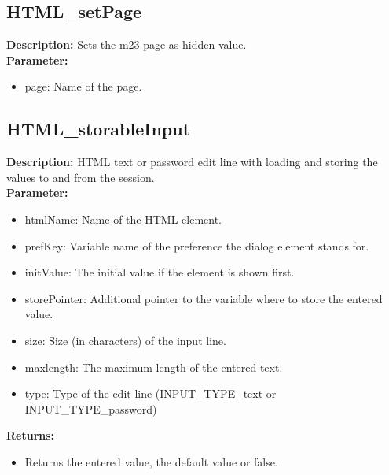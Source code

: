 \subsection{HTML\_setPage}
\textbf{Description:} Sets the m23 page as hidden value.\\
\textbf{Parameter:}
\begin{itemize}
\item page: Name of the page.
\end{itemize}

\subsection{HTML\_storableInput}
\textbf{Description:} HTML text or password edit line with loading and storing the values to and from the session.\\
\textbf{Parameter:}
\begin{itemize}
\item htmlName: Name of the HTML element.
\item prefKey: Variable name of the preference the dialog element stands for.
\item initValue: The initial value if the element is shown first.
\item storePointer: Additional pointer to the variable where to store the entered value.
\item size: Size (in characters) of the input line.
\item maxlength: The maximum length of the entered text.
\item type: Type of the edit line (INPUT\_TYPE\_text or INPUT\_TYPE\_password)
\end{itemize}
\textbf{Returns:}
\begin{itemize}
\item Returns the entered value, the default value or false.
\end{itemize}

